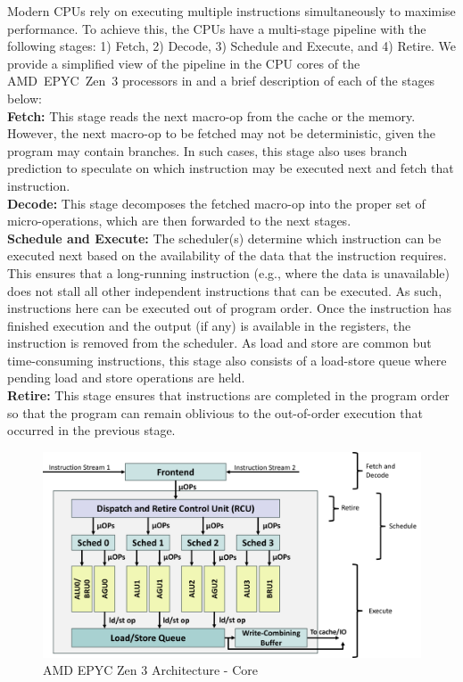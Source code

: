 Modern CPUs rely on executing multiple instructions simultaneously to maximise performance.
To achieve this, the CPUs have a multi-stage pipeline with the following stages: 1) Fetch, 2) Decode, 3) Schedule and Execute, and 4) Retire.
We provide a simplified view of the pipeline in the CPU cores of the AMD~EPYC~Zen~3 processors in  and a brief description of each of the stages below:\\
\textbf{Fetch: } This stage reads the next macro-op from the cache or the memory. 
However, the next macro-op to be fetched may not be deterministic, given the program may contain branches. 
In such cases, this stage also uses branch prediction to speculate on which instruction may be executed next and fetch that instruction.\\
\textbf{Decode: } This stage decomposes the fetched macro-op into the proper set of micro-operations, which are then forwarded to the next stages.\\
\textbf{Schedule and Execute: } The scheduler(s) determine which instruction can be executed next based on the availability of the data that the instruction requires. 
This ensures that a long-running instruction (e.g., where the data is unavailable) does not stall all other independent instructions that can be executed.
As such, instructions here can be executed out of program order. 
Once the instruction has finished execution and the output (if any) is available in the registers, the instruction is removed from the scheduler.
As load and store are common but time-consuming instructions, this stage also consists of a load-store queue where pending load and store operations are held. \\
\textbf{Retire: } This stage ensures that instructions are completed in the program order so that the program can remain oblivious to the out-of-order execution that occurred in the previous stage.

\begin{figure}[!htb]
    \centering
    \includegraphics[width=1.1\columnwidth]{figures/interconnect-sc/amd_arch/core.png}
    \caption{AMD EPYC Zen 3 Architecture - Core}
    \label{fig:amd-core}
\end{figure}

